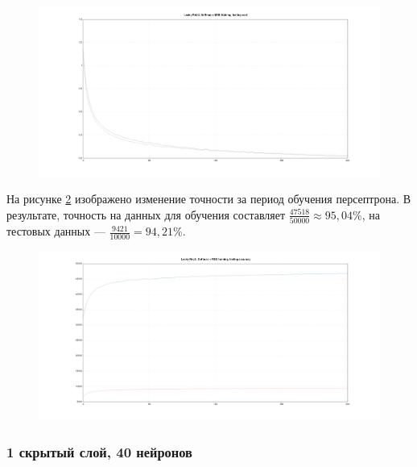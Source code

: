 \documentclass[a4paper, 14pt]{extarticle}
\begin{document}
\begin{figure}[!htb]
  \centering\includegraphics[width=\textwidth]{images/1_20_leaky_relu_softmax_mse_cost.png}
  \caption{}
  \label{fig:1_20_leaky_relu_softmax_mse_cost}
\end{figure}

На рисунке \ref{fig:1_20_leaky_relu_softmax_mse_accuracy} изображено изменение точности за период обучения персептрона.
В результате, точность на данных для обучения составляет $\frac{47518}{50000} \approx 95,04\%$, на тестовых данных --- $\frac{9421}{10000} = 94,21\%$.

\begin{figure}[!htb]
  \centering\includegraphics[width=\textwidth]{images/1_20_leaky_relu_softmax_mse_accuracy.png}
  \caption{}
  \label{fig:1_20_leaky_relu_softmax_mse_accuracy}
\end{figure}

\subsubsection{1 скрытый слой, 40 нейронов}

\end{document}
